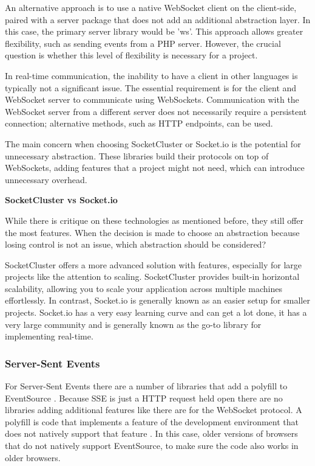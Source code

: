 An alternative approach is to use a native WebSocket client on the client-side, paired with a server package that does not add an additional abstraction layer. In this case, the primary server library would be 'ws'. This approach allows greater flexibility, such as sending events from a PHP server. However, the crucial question is whether this level of flexibility is necessary for a project.

In real-time communication, the inability to have a client in other languages is typically not a significant issue. The essential requirement is for the client and WebSocket server to communicate using WebSockets. Communication with the WebSocket server from a different server does not necessarily require a persistent connection; alternative methods, such as HTTP endpoints, can be used.

The main concern when choosing SocketCluster or Socket.io is the potential for unnecessary abstraction. These libraries build their protocols on top of WebSockets, adding features that a project might not need, which can introduce unnecessary overhead.

\textbf{SocketCluster vs Socket.io}

While there is critique on these technologies as mentioned before, they still offer the most features. When the decision is made to choose an abstraction because losing control is not an issue, which abstraction should be considered?

SocketCluster offers a more advanced solution with features, especially for large projects like the attention to scaling.  SocketCluster provides built-in horizontal scalability, allowing you to scale your application across multiple machines effortlessly. \cite{socket-io-vs-socketcluster} In contrast, Socket.io is generally known as an easier setup for smaller projects. Socket.io has a very easy learning curve and can get a lot done, it has a very large community and is generally known as the go-to library for implementing real-time. 

\subsubsection{Server-Sent Events}

For Server-Sent Events there are a number of libraries that add a polyfill to EventSource \cite{mdn-sse}. Because SSE is just a HTTP request held open there are no libraries adding additional features like there are for the WebSocket protocol. A polyfill is code that implements a feature of the development environment that does not natively support that feature \cite{polyfill}. In this case, older versions of browsers that do not natively support EventSource, to make sure the code also works in older browsers.

